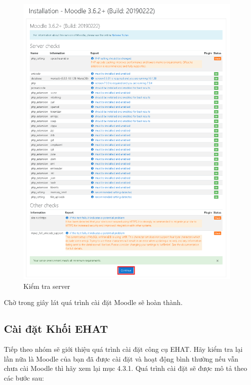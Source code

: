\begin{center}
	\begin{figure}[htp]
		\begin{center}
			\includegraphics[width=0.65\linewidth]{img/5}
		\end{center}
		\caption{Kiểm tra server}
		\label{refhinh35}
	\end{figure}
\end{center}

\vskip 9cm
Chờ trong giây lát quá trình cài đặt Moodle sẽ hoàn thành.

\subsection{Cài đặt Khối EHAT}
Tiếp theo nhóm sẽ giới thiệu quá trình cài đặt công cụ EHAT. Hãy kiểm tra lại lần nữa là Moodle của bạn đã được cài đặt và hoạt động bình thường nếu vẫn chưa cài Moodle thì hãy xem lại mục 4.3.1. Quá trình cài đặt sẽ được mô tả theo các bước sau:

